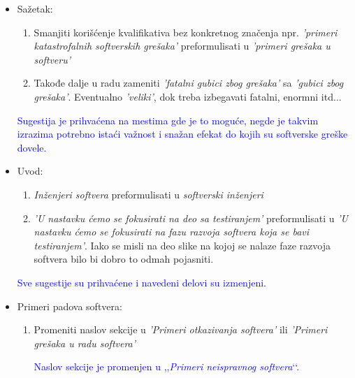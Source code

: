 \documentclass[a4paper]{report}
\newcommand{\odgovor}[1]{\textcolor{blue}{#1}}
\begin{document}
\begin{itemize}
    \item Sažetak:
    \begin{enumerate}
        \item Smanjiti korišćenje kvalifikativa bez konkretnog značenja npr. \textit{'primeri katastrofalnih softverskih grešaka'} preformulisati u \textit{'primeri grešaka u softveru'}
        
        \item Takođe dalje u radu zameniti \textit{'fatalni gubici zbog grešaka'} sa \textit{'gubici zbog grešaka'}. Eventualno \textit{'veliki'}, dok treba izbegavati fatalni, enormni itd...
    \end{enumerate}
    
\odgovor{
Sugestija je prihvaćena na mestima gde je to moguće, negde je takvim izrazima potrebno istaći važnost i snažan efekat do kojih su softverske greške dovele.
}    
    
    \item Uvod:
    \begin{enumerate}
        \item \textit{Inženjeri softvera} preformulisati u \textit{softverski inženjeri}
        \item \textit{'U nastavku ćemo se fokusirati na deo sa testiranjem'} preformulisati u \textit{'U nastavku ćemo se fokusirati na fazu razvoja softvera koja se bavi testiranjem'}. Iako se misli na deo slike na kojoj se nalaze faze razvoja softvera bilo bi dobro to odmah pojasniti.
    \end{enumerate}
    
\odgovor{
Sve sugestije su prihvaćene i navedeni delovi su izmenjeni.
}     
    
    \item Primeri padova softvera:
    \begin{enumerate}
        \item Promeniti naslov sekcije u \textit{'Primeri otkazivanja softvera'} ili \textit{'Primeri grešaka u radu softvera'}

\odgovor{
Naslov sekcije je promenjen u ,,\textit{Primeri neispravnog softvera}‘‘.
}        
        

\end{enumerate}
\end{itemize}
\end{document}

